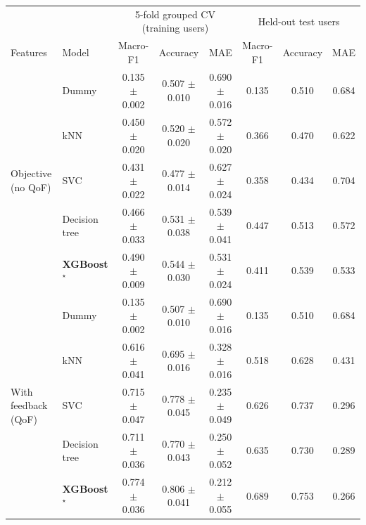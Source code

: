 \begin{tabular}{llccc|ccc}
\toprule
 & & \multicolumn{3}{c|}{5-fold grouped CV (training users)} & \multicolumn{3}{c}{Held-out test users} \\
Features & Model & Macro-F1 & Accuracy & MAE & Macro-F1 & Accuracy & MAE \\
\midrule
\multirow{5}{*}{Objective (no QoF)} & Dummy & 0.135 $\pm$ 0.002 & 0.507 $\pm$ 0.010 & 0.690 $\pm$ 0.016 & 0.135 & 0.510 & 0.684 \\
 & kNN & 0.450 $\pm$ 0.020 & 0.520 $\pm$ 0.020 & 0.572 $\pm$ 0.020 & 0.366 & 0.470 & 0.622 \\
 & SVC & 0.431 $\pm$ 0.022 & 0.477 $\pm$ 0.014 & 0.627 $\pm$ 0.024 & 0.358 & 0.434 & 0.704 \\
 & Decision tree & 0.466 $\pm$ 0.033 & 0.531 $\pm$ 0.038 & 0.539 $\pm$ 0.041 & 0.447 & 0.513 & 0.572 \\
 & \textbf{XGBoost}$^\star$ & 0.490 $\pm$ 0.009 & 0.544 $\pm$ 0.030 & 0.531 $\pm$ 0.024 & 0.411 & 0.539 & 0.533 \\
\midrule
\multirow{5}{*}{With feedback (QoF)} & Dummy & 0.135 $\pm$ 0.002 & 0.507 $\pm$ 0.010 & 0.690 $\pm$ 0.016 & 0.135 & 0.510 & 0.684 \\
 & kNN & 0.616 $\pm$ 0.041 & 0.695 $\pm$ 0.016 & 0.328 $\pm$ 0.016 & 0.518 & 0.628 & 0.431 \\
 & SVC & 0.715 $\pm$ 0.047 & 0.778 $\pm$ 0.045 & 0.235 $\pm$ 0.049 & 0.626 & 0.737 & 0.296 \\
 & Decision tree & 0.711 $\pm$ 0.036 & 0.770 $\pm$ 0.043 & 0.250 $\pm$ 0.052 & 0.635 & 0.730 & 0.289 \\
 & \textbf{XGBoost}$^\star$ & 0.774 $\pm$ 0.036 & 0.806 $\pm$ 0.041 & 0.212 $\pm$ 0.055 & 0.689 & 0.753 & 0.266 \\
\bottomrule
\end{tabular}
